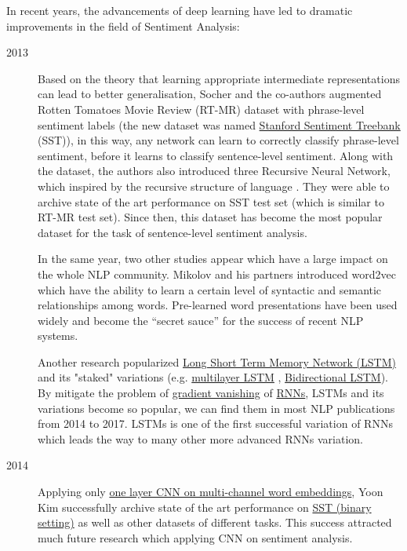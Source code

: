 In recent years, the advancements of deep learning have led to dramatic improvements in the field of Sentiment Analysis:
\begin{description}
\item [2013] Based on the theory that learning appropriate intermediate representations can lead to better generalisation\cite{knowledge-matter}\cite{tran-auto-encoder}, Socher and the co-authors augmented Rotten Tomatoes Movie Review  (RT-MR) dataset\cite{Rotten-Tomato} with phrase-level sentiment labels (the new dataset was named \hyperref[sec:sst]{Stanford Sentiment Treebank} (SST)), in this way, any network can learn to correctly classify phrase-level sentiment, before it learns to classify sentence-level sentiment\cite{socher2013recursive}. Along with the dataset, the authors also introduced three Recursive Neural Network, which inspired by the recursive structure of language \cite{socher2013recursive}.
They were able to archive state of the art performance on SST test set (which is similar to RT-MR test set). 
Since then, this dataset has become the most popular dataset for the task of sentence-level sentiment analysis.

In the same year, two other studies appear which have a large impact on the whole NLP community. 
Mikolov and his partners introduced word2vec which have the ability to learn a certain level of syntactic and semantic relationships among words\cite{word2vec}. 
Pre-learned word presentations have been used widely and become the “secret sauce” for the success of recent NLP systems\cite{Luong_betterword}.

Another research\cite{GravesLSTM} popularized \hyperref[sec:lstm]{Long Short Term Memory Network (LSTM)} and its "staked" variations (e.g. \hyperref[sec:multilayer-lstm]{multilayer LSTM} , \hyperref[sec:bilstm]{Bidirectional LSTM}).
By mitigate the problem of \hyperref[sec:gradient-vanish]{gradient vanishing} of \hyperref[sec:RNN]{RNNs}, LSTMs and its variations become so popular, we can find them in most NLP publications from 2014 to 2017. 
LSTMs is one of the first successful variation of RNNs which leads the way to many other more advanced RNNs variation\cite{olah2016attention}.
\item [2014] Applying only \hyperref[kim-cnn]{one layer CNN on multi-channel word embeddings}, Yoon Kim successfully archive state of the art performance on \hyperref[sec:sst]{SST (binary setting)} as well as other datasets of different tasks\cite{KimCNN}. 
This success attracted much future research which applying CNN on sentiment analysis\cite{2-layer-cnn}\cite{cnn-rnn}.


\end{description}
